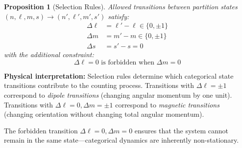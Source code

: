 \documentclass[twocolumn,10pt]{article}
\newtheorem{proposition}[theorem]{Proposition}
\theoremstyle{remark}
\begin{document}
\begin{proposition}[Selection Rules]
\label{prop:selection_rules}
Allowed transitions between partition states $(n, \ell, m, s) \to (n', \ell', m', s')$ satisfy:
\begin{align}
    \Delta \ell &= \ell' - \ell \in \{0, \pm 1\} \label{eq:selection_Delta_l} \\
    \Delta m &= m' - m \in \{0, \pm 1\} \label{eq:selection_Delta_m} \\
    \Delta s &= s' - s = 0 \label{eq:selection_Delta_s}
\end{align}
with the additional constraint:
\begin{equation}
    \Delta \ell = 0 \text{ is forbidden when } \Delta m = 0
    \label{eq:selection_forbidden}
\end{equation}
\end{proposition}

\textbf{Physical interpretation:} Selection rules determine which categorical state transitions contribute to the counting process. Transitions with $\Delta \ell = \pm 1$ correspond to \textit{dipole transitions} (changing angular momentum by one unit). Transitions with $\Delta \ell = 0, \Delta m = \pm 1$ correspond to \textit{magnetic transitions} (changing orientation without changing total angular momentum).

The forbidden transition $\Delta \ell = 0, \Delta m = 0$ ensures that the system cannot remain in the same state—categorical dynamics are inherently non-stationary.
\end{document}
